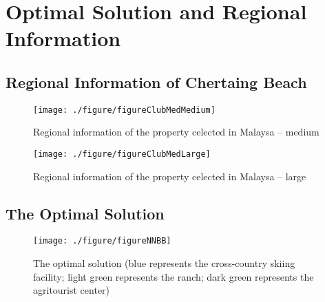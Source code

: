 \documentclass[./main.tex]{subfiles}
\begin{document}
    \section{Optimal Solution and Regional Information}

    \subsection{Regional Information of Chertaing Beach}

    \begin{figure}[H]
        \centering
        \texttt{[image: ./figure/figureClubMedMedium]}
        \caption{Regional information of the property celected in Malaysa -- medium}
        \label{fig:figureClubMedMedium}
    \end{figure}

    \begin{figure}[H]
        \centering
        \texttt{[image: ./figure/figureClubMedLarge]}
        \caption{Regional information of the property celected in Malaysa -- large}
        \label{fig:figureClubMedLarge}
    \end{figure}

    \subsection{The Optimal Solution}

    \begin{figure}[H]
        \centering
        \texttt{[image: ./figure/figureNNBB]}
        \caption{The optimal solution (blue represents the  cross-country skiing facility; light green represents the ranch; dark green represents the agritourist center)}
        \label{fig:figureNNBB}
    \end{figure}
\end{document}
